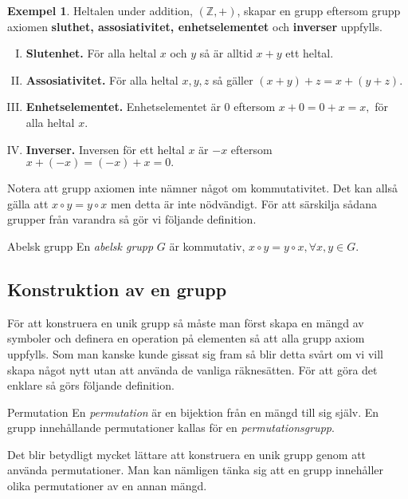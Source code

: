 \documentclass{article}
\theoremstyle{definition}
\newtheorem{exmp}[thm]{Exempel}
\begin{document}
\begin{exmp}
  Heltalen under addition, $(\mathbb{Z}, +)$, skapar en grupp eftersom grupp axiomen 
  \textbf{sluthet, assosiativitet, enhetselementet} och \textbf{inverser} uppfylls.

  \begin{enumerate}[I)]
    \item \textbf{Slutenhet.} För alla heltal $x$ och $y$ så är alltid $x + y$ ett heltal. 
    \item \textbf{Assosiativitet.} För alla heltal $x, y, z$ så gäller $(x + y) + z = x + (y + z).$
    \item \textbf{Enhetselementet.} Enhetselementet är 0 eftersom $x + 0 = 0 + x = x,$ för alla heltal $x.$
    \item \textbf{Inverser.} Inversen för ett heltal $x$ är $-x$ eftersom $x + (-x) = (-x) + x = 0.$
  \end{enumerate}
\end{exmp}
Notera att grupp axiomen inte nämner något om kommutativitet. Det kan allså gälla att 
$x \circ y = y \circ x$ men detta är inte nödvändigt. För att särskilja sådana grupper från 
varandra så gör vi följande definition.
\begin{mydef}{Abelsk grupp}{}
  En \textit{abelsk grupp} $G$ är kommutativ, $x \circ y = y \circ x, \forall x, y \in G.$
\end{mydef}

\subsection{Konstruktion av en grupp}
För att konstruera en unik grupp så måste man först skapa en mängd av symboler och definera 
en operation på elementen så att alla grupp axiom uppfylls.
Som man kanske kunde gissat sig fram så blir detta svårt om vi vill skapa något nytt 
utan att använda de vanliga räknesätten. För att göra det enklare så görs följande definition.
\begin{mydef}{Permutation}{}
  En \textit{permutation} är en bijektion från en mängd till sig själv. En grupp innehållande 
  permutationer kallas för en \textit{permutationsgrupp}.
\end{mydef}
Det blir betydligt mycket lättare att konstruera en unik grupp genom att använda permutationer. 
Man kan nämligen tänka sig att en grupp innehåller olika permutationer av en annan mängd. 
\end{document}
